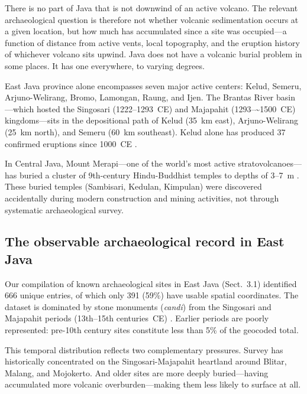 \documentclass[egqsj, manuscript]{copernicus}
\begin{document}
There is no part of Java that is not downwind of an active volcano. The relevant archaeological question is therefore not whether volcanic sedimentation occurs at a given location, but how much has accumulated since a site was occupied---a function of distance from active vents, local topography, and the eruption history of whichever volcano sits upwind. Java does not have a volcanic burial problem in some places. It has one everywhere, to varying degrees.

East Java province alone encompasses seven major active centers: Kelud, Semeru, Arjuno-Welirang, Bromo, Lamongan, Raung, and Ijen. The Brantas River basin---which hosted the Singosari (1222--1293~CE) and Majapahit (1293--\textasciitilde1500~CE) kingdoms---sits in the depositional path of Kelud (35~km east), Arjuno-Welirang (25~km north), and Semeru (60~km southeast). Kelud alone has produced 37 confirmed eruptions since 1000~CE \citep{gvp2024,maeno2019}.

In Central Java, Mount Merapi---one of the world's most active stratovolcanoes---has buried a cluster of 9th-century Hindu-Buddhist temples to depths of 3--7~m \citep{lavigne2000,thouret2000}. These buried temples (Sambisari, Kedulan, Kimpulan) were discovered accidentally during modern construction and mining activities, not through systematic archaeological survey.

\subsection{The observable archaeological record in East Java}

Our compilation of known archaeological sites in East Java (Sect.~3.1) identified 666 unique entries, of which only 391 (59\%) have usable spatial coordinates. The dataset is dominated by stone monuments (\textit{candi}) from the Singosari and Majapahit periods (13th--15th centuries~CE) \citep{kinney2003}. Earlier periods are poorly represented: pre-10th century sites constitute less than 5\% of the geocoded total.

This temporal distribution reflects two complementary pressures. Survey has historically concentrated on the Singosari-Majapahit heartland around Blitar, Malang, and Mojokerto. And older sites are more deeply buried---having accumulated more volcanic overburden---making them less likely to surface at all.
\end{document}
